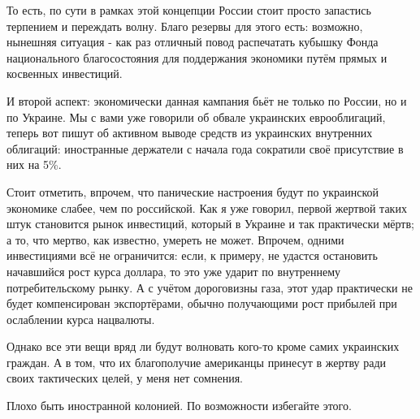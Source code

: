 То есть, по сути в рамках этой концепции России стоит просто запастись
терпением и переждать волну. Благо резервы для этого есть: возможно, нынешняя
ситуация - как раз отличный повод распечатать кубышку Фонда национального
благосостояния для поддержания экономики путём прямых и косвенных инвестиций.

И второй аспект: экономически данная кампания бьёт не только по России, но и по
Украине. Мы с вами уже говорили об обвале украинских еврооблигаций, теперь вот
пишут об активном выводе средств из украинских внутренних облигаций:
иностранные держатели с начала года сократили своё присутствие в них на 5\%. 

Стоит отметить, впрочем, что панические настроения будут по украинской
экономике слабее, чем по российской. Как я уже говорил, первой жертвой таких
штук становится рынок инвестиций, который в Украине и так практически мёртв; а
то, что мертво, как известно, умереть не может. Впрочем, одними инвестициями
всё не ограничится: если, к примеру, не удастся остановить начавшийся рост
курса доллара, то это уже ударит по внутреннему потребительскому рынку. А с
учётом дороговизны газа, этот удар практически не будет компенсирован
экспортёрами, обычно получающими рост прибылей при ослаблении курса нацвалюты. 

Однако все эти вещи вряд ли будут волновать кого-то кроме самих украинских
граждан. А в том, что их благополучие американцы принесут в жертву ради своих
тактических целей, у меня нет сомнения. 

Плохо быть иностранной колонией. По возможности избегайте этого.

